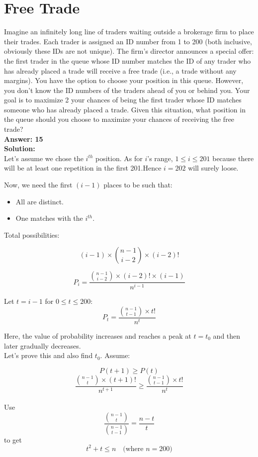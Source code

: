 \documentclass[12pt]{article}
\begin{document}
\section{Free Trade}
Imagine an infinitely long line of traders waiting outside a brokerage firm to place their trades.
Each trader is assigned an ID number from 1 to 200 (both inclusive, obviously these IDs are not
unique). The firm’s director announces a special offer: the first trader in the queue whose ID
number matches the ID of any trader who has already placed a trade will receive a free trade (i.e.,
a trade without any margins). You have the option to choose your position in this queue. However,
you don’t know the ID numbers of the traders ahead of you or behind you. Your goal is to maximize
2
your chances of being the first trader whose ID matches someone who has already placed a trade.
Given this situation, what position in the queue should you choose to maximize your chances of
receiving the free trade?\\
\textbf{Answer: 15} 
\\
\textbf{Solution:} \\

Let’s assume we chose the $i^{th}$ position. As for $i$'s range, $1 \leq i \leq 201$ because there will be at least one repetition in the first 201.Hence $i=202$ will surely loose.

Now, we need the first $(i-1)$ places to be such that:
\begin{itemize}
    \item All are distinct.
    \item One matches with the $i^{th}$.
\end{itemize}

Total possibilities:

\[
(i-1) \times \binom{n-1}{i-2} \times (i-2)!
\]

\[
P_i = \frac{\binom{n-1}{i-2} \times (i-2)! \times (i-1)}{n^{i-1}}
\]

Let $t = i-1$ for $0 \leq t \leq 200$:
\[
P_t = \frac{\binom{n-1}{t-1} \times t!}{n^t}
\]

Here, the value of probability increases and reaches a peak at $t = t_0$ and then later gradually decreases.\\
Let's prove this and also find $t_0$. Assume:

\[
P(t+1) \geq P(t)
\]
\[
    \frac{\binom{n-1}{t} \times (t+1)!}{n^{t+1}} \geq \frac{\binom{n-1}{t-1} \times t!}{n^t}
\]
\\
Use $$\frac{\binom{n-1}{t}}{\binom{n-1}{t-1}} = \frac{n-t}{t}$$ to get
\[
t^2 + t \leq n \quad \text{(where $n=200$)}
\]
\end{document}
